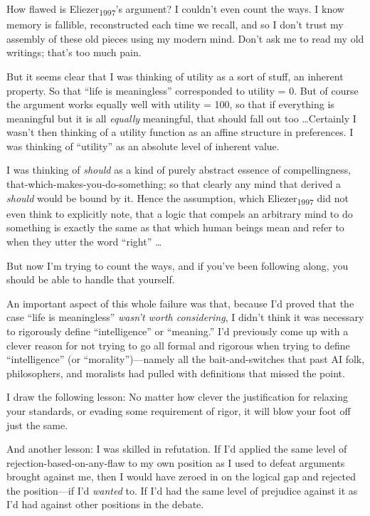 {
 How flawed is Eliezer\textsubscript{1997}'s
argument? I couldn't even count the ways. I know memory
is fallible, reconstructed each time we recall, and so I
don't trust my assembly of these old pieces using my
modern mind. Don't ask me to read my old writings;
that's too much pain.}

{
 But it seems clear that I was thinking of utility as a sort of
stuff, an inherent property. So that ``life is
meaningless'' corresponded to utility = 0. But of
course the argument works equally well with utility = 100, so that if
everything is meaningful but it is all \textit{equally} meaningful,
that should fall out too \ldots Certainly I wasn't then
thinking of a utility function as an affine structure in preferences. I
was thinking of ``utility'' as an
absolute level of inherent value.}

{
 I was thinking of \textit{should} as a kind of purely abstract
essence of compellingness, that-which-makes-you-do-something; so that
clearly any mind that derived a \textit{should} would be bound by it.
Hence the assumption, which Eliezer\textsubscript{1997} did not even
think to explicitly note, that a logic that compels an arbitrary mind
to do something is exactly the same as that which human beings mean and
refer to when they utter the word
``right'' \ldots}

{
 But now I'm trying to count the ways, and if
you've been following along, you should be able to
handle that yourself.}

{
 An important aspect of this whole failure was that, because
I'd proved that the case ``life is
meaningless'' \textit{wasn't worth
considering}, I didn't think it was necessary to
rigorously define ``intelligence''
or ``meaning.'' I'd
previously come up with a clever reason for not trying to go all formal
and rigorous when trying to define
``intelligence'' (or
``morality'')---namely all the
bait-and-switches that past AI folk, philosophers, and moralists had
pulled with definitions that missed the point.}

{
 I draw the following lesson: No matter how clever the
justification for relaxing your standards, or evading some requirement
of rigor, it will blow your foot off just the same.}

{
 And another lesson: I was skilled in refutation. If
I'd applied the same level of
rejection-based-on-any-flaw to my own position as I used to defeat
arguments brought against me, then I would have zeroed in on the
logical gap and rejected the position---if I'd
\textit{wanted} to. If I'd had the same level of
prejudice against it as I'd had against other positions
in the debate.}

